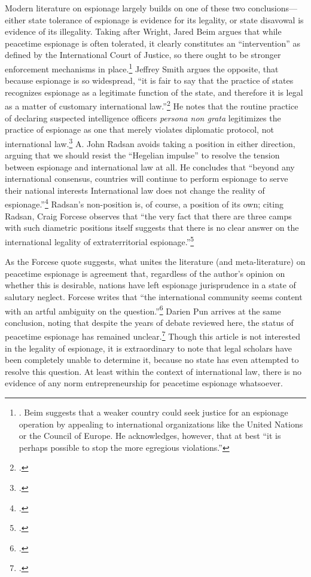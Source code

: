 \documentclass[12pt]{extarticle}
\begin{document}
Modern literature on espionage largely builds on one of these two conclusions---either state tolerance of espionage is evidence for its legality, or state disavowal is evidence of its illegality. Taking after Wright, Jared Beim argues that while peacetime espionage is often tolerated, it clearly constitutes an \enquote{intervention} as defined by the International Court of Justice, so there ought to be stronger enforcement mechanisms in place.\footnote{\cite[672]{beim_enforcing_2018}. Beim suggests that a weaker country could seek justice for an espionage operation by appealing to international organizations like the United Nations or the Council of Europe. He acknowledges, however, that at best \enquote{it is perhaps possible to stop the more egregious violations.}} Jeffrey Smith argues the opposite, that because espionage is so widespread, \enquote{it is fair to say that the practice of states recognizes espionage as a legitimate function of the state, and therefore it is legal as a matter of customary international law.}\footcite[544]{smith_keynote_2007} He notes that the routine practice of declaring suspected intelligence officers \emph{persona non grata} legitimizes the practice of espionage as one that merely violates diplomatic protocol, not international law.\footcite[544]{smith_keynote_2007} A. John Radsan avoids taking a position in either direction, arguing that we should resist the \enquote{Hegelian impulse} to resolve the tension between espionage and international law at all. He concludes that \enquote{beyond any international consensus, countries will continue to perform espionage to serve their national interests \textelp{} International law does not change the reality of espionage.}\footcite[623]{radsan_unresolved_2007} Radsan's non-position is, of course, a position of its own; citing Radsan, Craig Forcese observes that \enquote{the very fact that there are three camps with such diametric positions itself suggests that \textelp{} there is no clear answer on the international legality of extraterritorial espionage.}\footcite[204-205]{forcese_spies_2011}

As the Forcese quote suggests, what unites the literature (and meta-literature) on peacetime espionage is agreement that, regardless of the author's opinion on whether this is desirable, nations have left espionage jurisprudence in a state of salutary neglect. Forcese writes that \enquote{the international community seems content with an artful ambiguity on the question.}\footcite[205]{forcese_spies_2011} Darien Pun arrives at the same conclusion, noting that despite the years of debate reviewed here, the status of peacetime espionage has remained unclear.\footcite[260]{pun_rethinking_2017} Though this article is not interested in the legality of espionage, it is extraordinary to note that legal scholars have been completely unable to determine it, because no state has even attempted to resolve this question. At least within the context of international law, there is no evidence of any norm entrepreneurship for peacetime espionage whatsoever.
\end{document}

